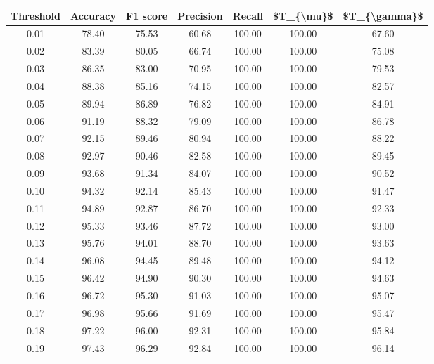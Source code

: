\begin{tabular}{|c|c|c|c|c|c|c|}
\hline
 Threshold &  Accuracy &  F1 score &  Precision &  Recall &  \$T\_\{\textbackslash mu\}\$ &  \$T\_\{\textbackslash gamma\}\$ \\
\hline
      0.01 &     78.40 &     75.53 &      60.68 &  100.00 &     100.00 &         67.60 \\
      0.02 &     83.39 &     80.05 &      66.74 &  100.00 &     100.00 &         75.08 \\
      0.03 &     86.35 &     83.00 &      70.95 &  100.00 &     100.00 &         79.53 \\
      0.04 &     88.38 &     85.16 &      74.15 &  100.00 &     100.00 &         82.57 \\
      0.05 &     89.94 &     86.89 &      76.82 &  100.00 &     100.00 &         84.91 \\
      0.06 &     91.19 &     88.32 &      79.09 &  100.00 &     100.00 &         86.78 \\
      0.07 &     92.15 &     89.46 &      80.94 &  100.00 &     100.00 &         88.22 \\
      0.08 &     92.97 &     90.46 &      82.58 &  100.00 &     100.00 &         89.45 \\
      0.09 &     93.68 &     91.34 &      84.07 &  100.00 &     100.00 &         90.52 \\
      0.10 &     94.32 &     92.14 &      85.43 &  100.00 &     100.00 &         91.47 \\
      0.11 &     94.89 &     92.87 &      86.70 &  100.00 &     100.00 &         92.33 \\
      0.12 &     95.33 &     93.46 &      87.72 &  100.00 &     100.00 &         93.00 \\
      0.13 &     95.76 &     94.01 &      88.70 &  100.00 &     100.00 &         93.63 \\
      0.14 &     96.08 &     94.45 &      89.48 &  100.00 &     100.00 &         94.12 \\
      0.15 &     96.42 &     94.90 &      90.30 &  100.00 &     100.00 &         94.63 \\
      0.16 &     96.72 &     95.30 &      91.03 &  100.00 &     100.00 &         95.07 \\
      0.17 &     96.98 &     95.66 &      91.69 &  100.00 &     100.00 &         95.47 \\
      0.18 &     97.22 &     96.00 &      92.31 &  100.00 &     100.00 &         95.84 \\
      0.19 &     97.43 &     96.29 &      92.84 &  100.00 &     100.00 &         96.14 \\

\end{tabular}
